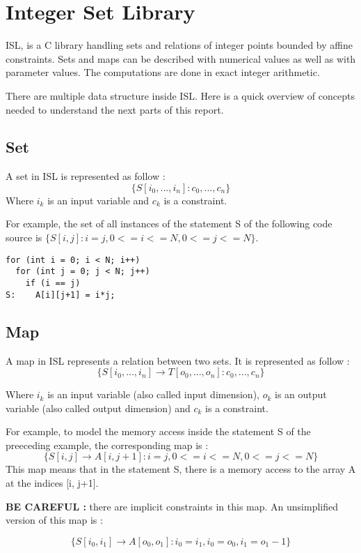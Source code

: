 \chapter{Integer Set Library}\label{ch:ISL}

\ac{ISL}\cite{ISL}, is a C library handling sets and relations of integer points bounded by affine constraints. Sets and maps can be described with numerical values as well as with parameter values. The computations are done in exact integer arithmetic. 

There are multiple data structure inside ISL. Here is a quick overview of concepts needed to understand the next parts of this report. 

\section{Set}
A set in ISL is represented as follow :
\[
\{S[i_0,...,i_n]:c_0,...,c_n\}
\]
Where $i_k$ is an input variable and $c_k$ is a constraint.

For example, the set of all instances of the statement S of the following code source is $\{S[i,j]:i=j,0<=i<=N,0<=j<=N\}$.
\begin{lstlisting}[frame=single]
for (int i = 0; i < N; i++)
  for (int j = 0; j < N; j++)
    if (i == j)
S:    A[i][j+1] = i*j;
\end{lstlisting}

\section{Map}
A map in ISL represents a relation between two sets. It is represented as follow :
\[
\{S[i_0,...,i_n] \rightarrow T[o_0,...,o_n]:c_0,...,c_n\}
\]

Where $i_k$ is an input variable (also called input dimension), $o_k$ is an output variable (also called output dimension) and $c_k$ is a constraint.

For example, to model the memory access inside the statement S of the preeceding example, the corresponding map is :
\[
\{S[i,j] \rightarrow A[i,j+1]:i=j,0<=i<=N,0<=j<=N\}
\]
This map means that in the statement S, there is a memory access to the array A at the indices [i, j+1].

\textbf{BE CAREFUL :} there are implicit constraints in this map. An unsimplified version of this map is :

\[
\{S[i_0,i_1] \rightarrow A[o_0,o_1]:i_0=i_1,i_0=o_0,i_1=o_1-1\}
\]

